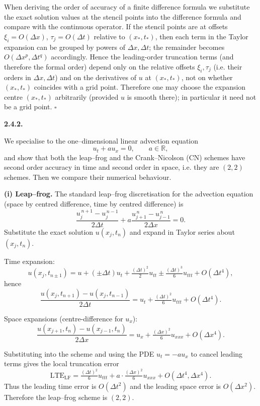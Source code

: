 \documentclass[11pt]{article}
\begin{document}
When deriving the order of accuracy of a finite difference formula we substitute the exact solution values at the stencil points into the difference formula and compare with the continuous operator. If the stencil points are at offsets \(\xi_i=O(\Delta x)\), \(\tau_j=O(\Delta t)\) relative to \((x_*,t_*)\), then each term in the Taylor expansion can be grouped by powers of \(\Delta x,\Delta t\); the remainder becomes \(O(\Delta x^p,\Delta t^q)\) accordingly. Hence the leading-order truncation terms (and therefore the formal order) depend only on the relative offsets \(\xi_i,\tau_j\) (i.e. their orders in \(\Delta x,\Delta t\)) and on the derivatives of \(u\) at \((x_*,t_*)\), not on whether \((x_*,t_*)\) coincides with a grid point. Therefore one may choose the expansion centre \((x_*,t_*)\) arbitrarily (provided \(u\) is smooth there); in particular it need not be a grid point. \(\square\)

\vspace{1em}

\noindent\textbf{2.4.2.}

We specialise to the one–dimensional linear advection equation
\[
u_t + a u_x = 0,\qquad a\in\mathbb{R},
\]
and show that both the leap–frog and the Crank--Nicolson (CN) schemes have second order accuracy in time and second order in space, i.e. they are \((2,2)\) schemes. Then we compare their numerical behaviour.

\medskip

\textbf{(i) Leap–frog.}
The standard leap–frog discretisation for the advection equation (space by centred difference, time by centred difference) is
\[
\frac{u_j^{\,n+1}-u_j^{\,n-1}}{2\Delta t} + a\frac{u_{j+1}^{\,n}-u_{j-1}^{\,n}}{2\Delta x} = 0.
\]
Substitute the exact solution \(u(x_j,t_n)\) and expand in Taylor series about \((x_j,t_n)\).

Time expansion:
\[
u(x_j,t_{n\pm1}) = u + (\pm\Delta t)u_t + \tfrac{(\Delta t)^2}{2}u_{tt} \pm \tfrac{(\Delta t)^3}{6}u_{ttt} + O(\Delta t^4),
\]
hence
\[
\frac{u(x_j,t_{n+1})-u(x_j,t_{n-1})}{2\Delta t}
= u_t + \tfrac{(\Delta t)^2}{6}u_{ttt} + O(\Delta t^4).
\]

Space expansions (centre-difference for \(u_x\)):
\[
\frac{u(x_{j+1},t_n)-u(x_{j-1},t_n)}{2\Delta x}
= u_x + \tfrac{(\Delta x)^2}{6}u_{xxx} + O(\Delta x^4).
\]

Substituting into the scheme and using the PDE \(u_t = -a u_x\) to cancel leading terms gives the local truncation error
\[
\mathrm{LTE}_{\mathrm{LF}} = \tfrac{(\Delta t)^2}{6}u_{ttt} + a\cdot\tfrac{(\Delta x)^2}{6}u_{xxx} + O(\Delta t^4,\Delta x^4).
\]
Thus the leading time error is \(O(\Delta t^2)\) and the leading space error is \(O(\Delta x^2)\). Therefore the leap–frog scheme is \((2,2)\).
\end{document}
